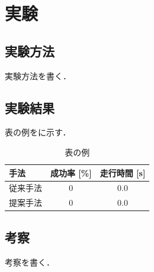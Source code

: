 \chapter{実験}
\label{chap:experiment}

\section{実験方法}
\label{sec:experiment_method}

実験方法を書く．

\section{実験結果}
\label{sec:experiment_result}

表の例をに示す．

\begin{table}[H]
  \centering
  \caption{表の例}
  \label{tab:sample}
  \begin{tabular}{lcc}
    \toprule
    手法 & 成功率 [\%] & 走行時間 [s] \\
    \midrule
    従来手法 & 0 & 0.0 \\
    提案手法 & 0 & 0.0 \\
    \bottomrule
  \end{tabular}
\end{table}

\section{考察}
\label{sec:discussion}

考察を書く．
